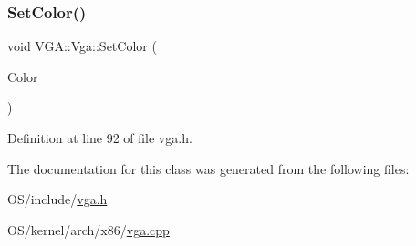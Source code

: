 \subsubsection{\texorpdfstring{Set\+Color()}{SetColor()}}
{\footnotesize\ttfamily void V\+G\+A\+::\+Vga\+::\+Set\+Color (\begin{DoxyParamCaption}\item[{\hyperlink{namespace_v_g_a_afa3882cddefd08a3f33aaf6fcbcbcd7f}{Vga\+Color}}]{Color }\end{DoxyParamCaption})\hspace{0.3cm}{\ttfamily [inline]}}



Definition at line 92 of file vga.\+h.



The documentation for this class was generated from the following files\+:\begin{DoxyCompactItemize}
\item 
O\+S/include/\hyperlink{vga_8h}{vga.\+h}\item 
O\+S/kernel/arch/x86/\hyperlink{vga_8cpp}{vga.\+cpp}\end{DoxyCompactItemize}
